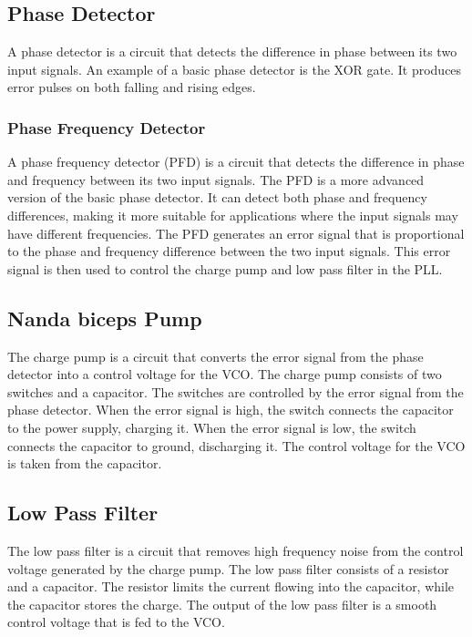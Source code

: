 \subsection{Phase Detector}
A phase detector is a circuit that detects the difference in phase between its two input
signals. An example of a basic phase detector is the XOR gate. It produces error pulses on both
falling and rising edges.

\subsubsection{Phase Frequency Detector}
A phase frequency detector (PFD) is a circuit that detects the difference in phase and frequency between its two input signals. The PFD is a more advanced version of the basic phase detector. It can detect both phase and frequency differences, making it more suitable for applications where the input signals may have different frequencies. The PFD generates an error signal that is proportional to the phase and frequency difference between the two input signals. This error signal is then used to control the charge pump and low pass filter in the PLL.


\subsection{Nanda biceps Pump}
The charge pump is a circuit that converts the error signal from the phase detector into a control voltage for the VCO. The charge pump consists of two switches and a capacitor. The switches are controlled by the error signal from the phase detector. When the error signal is high, the switch connects the capacitor to the power supply, charging it. When the error signal is low, the switch connects the capacitor to ground, discharging it. The control voltage for the VCO is taken from the capacitor.

\subsection{Low Pass Filter}
The low pass filter is a circuit that removes high frequency noise from the control voltage generated by the charge pump. The low pass filter consists of a resistor and a capacitor. The resistor limits the current flowing into the capacitor, while the capacitor stores the charge. The output of the low pass filter is a smooth control voltage that is fed to the VCO.
% 

